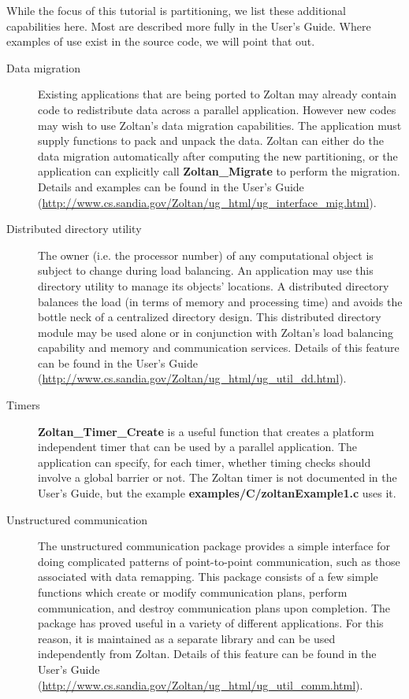 While the focus of this tutorial is partitioning, we list these additional
capabilities here.  Most are described more fully in the User's Guide.
Where examples of use exist in the source code, we will point that out.

\begin{description}
\item [Data migration]
Existing applications that are being ported to Zoltan may already contain code to 
redistribute data across a parallel application.  However new codes may wish to
use Zoltan's data migration capabilities.  The application must supply functions
to pack and unpack the data.  Zoltan can either do the data migration automatically
after computing the new partitioning, or the application can explicitly call
\textbf{Zoltan\_Migrate} to perform the migration.  
Details and examples can be
found in the User's Guide
(\url{http://www.cs.sandia.gov/Zoltan/ug\_html/ug\_interface\_mig.html}).


\item [Distributed directory utility]
The owner (i.e. the processor number) of any computational object is subject to 
change during load balancing. An application may use this directory utility to 
manage its objects' locations. A distributed directory balances the load (in terms 
of memory and processing time) and avoids the bottle neck of a centralized directory design.
This distributed directory module may be used alone or in conjunction with Zoltan's 
load balancing capability and memory and communication services.
Details of this feature can be found in the User's Guide
(\url{http://www.cs.sandia.gov/Zoltan/ug\_html/ug\_util\_dd.html}).

\item [Timers]
\textbf{Zoltan\_Timer\_Create} is a useful function 
that creates a platform independent
timer that can be used by a parallel application.  The application can
specify, for each timer, whether timing checks should involve a
global barrier or not.  The Zoltan timer is not documented in the User's
Guide, but the example \textbf{examples/C/zoltanExample1.c} uses it.

\item [Unstructured communication]
The unstructured communication package provides a simple interface for 
doing complicated patterns of point-to-point communication, such as those 
associated with data remapping. This package consists of a few simple functions 
which create or modify communication plans, perform communication, and destroy 
communication plans upon completion. The package has proved useful in a 
variety of different applications. For this reason, it is maintained as a separate 
library and can be used independently from Zoltan.
Details of this feature can be found in the User's Guide
(\url{http://www.cs.sandia.gov/Zoltan/ug\_html/ug\_util\_comm.html}).


\end{description}
